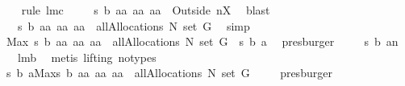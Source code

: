 \begin{isabellebody}
\ {}\ \isamarkupfalse%
\ {\isacharparenleft}rule\ lm{}{}c{\isacharparenright}\isanewline
{}\isamarkupfalse%
\ \isamarkupfalse%
\ {\isachardoublequoteopen}{\isachardot}{\isachardot}{\isachardot}\ {\isacharequal}\ {\isacharbraceleft}{\isacharquery}s\ b\ aa{\isacharbar}\ aa{\isachardot}\ aa\ {\isasymin}\ Outside{\isacharprime}\ {\isacharbraceleft}{\isacharquery}n{\isacharbraceright}{\isacharbackquote}{\isacharquery}X{\isacharbraceright}{\isachardoublequoteclose}\ \isamarkupfalse%
\ blast\isanewline
{}\isamarkupfalse%
\ \isamarkupfalse%
\ {\isachardoublequoteopen}{\isachardot}{\isachardot}{\isachardot}\ {\isacharequal}\ {\isacharbraceleft}{\isacharquery}s\ b\ aa{\isacharbar}\ aa{\isachardot}\ aa\ {\isasymin}\ allAllocations{\isacharprime}\ N\ {\isacharparenleft}set\ G{\isacharparenright}{\isacharbraceright}{\isachardoublequoteclose}\ \isamarkupfalse%
\ simp\isanewline
{}\isamarkupfalse%
\ \isamarkupfalse%
\ {\isachardoublequoteopen}Max\ {\isacharbraceleft}{\isacharquery}s\ b\ aa{\isacharbar}\ aa{\isachardot}\ aa\ {\isasymin}\ allAllocations{\isacharprime}\ N\ {\isacharparenleft}set\ G{\isacharparenright}{\isacharbraceright}\ {\isacharequal}\ {\isacharquery}s\ b\ a{\isachardoublequoteclose}\ \isamarkupfalse%
\ presburger\isanewline
{}\isamarkupfalse%
\ \isamarkupfalse%
\ {\isachardoublequoteopen}{\isachardot}{\isachardot}{\isachardot}\ {\isacharequal}\ {\isacharquery}s\ b\ {\isacharparenleft}a{\isacharminus}{\isacharminus}{\isacharquery}n{\isacharparenright}{\isachardoublequoteclose}\ \isamarkupfalse%
\ {}\ {}\ lm{}{}b\ \isamarkupfalse%
\ {\isacharparenleft}metis\ {\isacharparenleft}lifting{\isacharcomma}\ no{\isacharunderscore}types{\isacharparenright}{\isacharparenright}\isanewline
{}\isamarkupfalse%
\ \isamarkupfalse%
\ {\isachardoublequoteopen}{\isacharquery}s\ b\ {\isacharquery}a{\isacharequal}Max{\isacharbraceleft}{\isacharquery}s\ b\ aa{\isacharbar}\ aa{\isachardot}\ aa\ {\isasymin}\ allAllocations{\isacharprime}\ N\ {\isacharparenleft}set\ G{\isacharparenright}{\isacharbraceright}{\isachardoublequoteclose}\ \isamarkupfalse%
\ {}\ \isamarkupfalse%
\ presburger\isanewline
{}\isamarkupfalse%
%
\endisatagproof
{\isafoldproof}%
%
\isadelimproof

\end{isabellebody}
